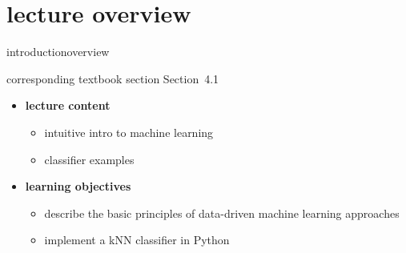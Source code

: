 


\subtitle{Module 4.1: Classification}


	

    \section[overview]{lecture overview}
        \begin{frame}{introduction}{overview}
            \begin{block}{corresponding textbook section}
                    Section~4.1
            \end{block}

            \begin{itemize}
                \item   \textbf{lecture content}
                    \begin{itemize}
                        \item   intuitive intro to machine learning
                        \item   classifier examples
                    \end{itemize}
                \bigskip
                \item<2->   \textbf{learning objectives}
                    \begin{itemize}
                        \item   describe the basic principles of data-driven machine learning approaches
                        \item   implement a kNN classifier in Python
                    \end{itemize}
            \end{itemize}
        \end{frame}

